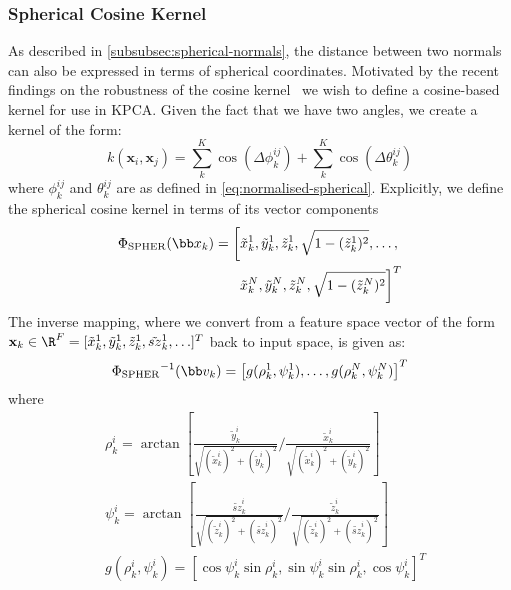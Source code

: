 \subsubsection{Spherical Cosine Kernel}\label{subsubsec:singl_img_cosine_kernel}
As described in \cref{subsubsec:spherical-normals}, the distance between
two normals can also be expressed in terms of spherical coordinates. Motivated
by the recent findings on the robustness of the cosine 
kernel~\cite{tzimiropoulos2012subspace,tzimiropoulos2010robust} 
we wish to define a cosine-based kernel for use in KPCA. Given the
fact that we have two angles, we create a kernel of the form:
\begin{equation}\label{eq:spher-cosine-kernel}
    k(\mathbf{x}_i, \mathbf{x}_j) = \sum^K_k \cos(\Delta \phi^{ij}_k) + \sum^K_k \cos(\Delta \theta^{ij}_k)
\end{equation}
where $\phi^{ij}_k$ and $\theta^{ij}_k$ are as defined in 
\cref{eq:normalised-spherical}. Explicitly, we define the spherical 
cosine kernel in terms of its vector components
\begin{equation}
    \begin{aligned}\label{eq:spher-kernel}
        \spher = \left[
                    \tilde{x}_k^1, \tilde{y}_k^1, \tilde{z}_k^1, \sqrt{1 - (\tilde{z}_k^1)^2}, \ldots, \right. \\
                    \left. \tilde{x}_k^N, \tilde{y}_k^N, \tilde{z}_k^N, \sqrt{1 - (\tilde{z}_k^N)^2}
                \right]^T
    \end{aligned}
\end{equation}
The inverse mapping, where we convert from a feature space vector of the form
$\mathbf{x}_k \in \R^F = [\tilde{x}_k^1, \tilde{y}_k^1, \tilde{z}_k^1,\tilde{sz}_k^1, \ldots]^T$ 
back to input space, is given as:
\begin{equation}\label{eq:inv-spher-kernel}
    \invspher = \left[ g (\rho_k^1, \psi_k^1), \ldots, g (\rho_k^N, \psi_k^N) \right]^T
\end{equation}
where 
\begin{equation}
    \begin{aligned}\label{eq:inv-spher-g}
        &\rho_k^i = \arctan [ \frac{\tilde{y}_k^i}{\sqrt{(\tilde{x}_k^i)^2 + (\tilde{y}_k^i)^2}} / \frac{\tilde{x}_k^i}{\sqrt{(\tilde{x}_k^i)^2 + (\tilde{y}_k^i)^2}} ] \\
        &\psi_k^i = \arctan [ \frac{\tilde{sz}_k^i}{\sqrt{(\tilde{z}_k^i)^2 + (\tilde{sz}_k^i)^2}} / \frac{\tilde{z}_k^i}{\sqrt{(\tilde{z}_k^i)^2 + (\tilde{sz}_k^i)^2}} ] \\
        &g(\rho_k^i, \psi_k^i) = [\cos \psi_k^i \sin \rho_k^i, \sin \psi_k^i \sin \rho_k^i, \cos \psi_k^i]^T
    \end{aligned}
\end{equation}
